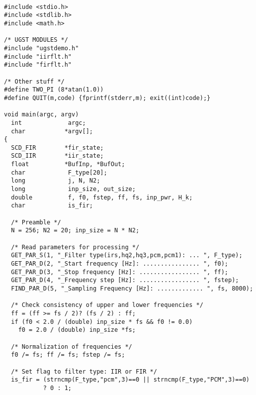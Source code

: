 {\tt\small
\begin{verbatim}
#include <stdio.h>
#include <stdlib.h>
#include <math.h>

/* UGST MODULES */
#include "ugstdemo.h"
#include "iirflt.h"
#include "firflt.h"

/* Other stuff */
#define TWO_PI (8*atan(1.0))
#define QUIT(m,code) {fprintf(stderr,m); exit((int)code);}

void main(argc, argv)
  int             argc;
  char           *argv[];
{
  SCD_FIR        *fir_state;
  SCD_IIR        *iir_state;
  float          *BufInp, *BufOut;
  char            F_type[20];
  long            j, N, N2;
  long            inp_size, out_size;
  double          f, f0, fstep, ff, fs, inp_pwr, H_k;
  char            is_fir;

  /* Preamble */
  N = 256; N2 = 20; inp_size = N * N2;

  /* Read parameters for processing */
  GET_PAR_S(1, "_Filter type(irs,hq2,hq3,pcm,pcm1): ... ", F_type);
  GET_PAR_D(2, "_Start frequency [Hz]: ................ ", f0);
  GET_PAR_D(3, "_Stop frequency [Hz]: ................. ", ff);
  GET_PAR_D(4, "_Frequency step [Hz]: ................. ", fstep);
  FIND_PAR_D(5, "_Sampling Frequency [Hz]: ............. ", fs, 8000);

  /* Check consistency of upper and lower frequencies */
  ff = (ff >= fs / 2)? (fs / 2) : ff;
  if (f0 < 2.0 / (double) inp_size * fs && f0 != 0.0)
    f0 = 2.0 / (double) inp_size *fs;

  /* Normalization of frequencies */
  f0 /= fs; ff /= fs; fstep /= fs;

  /* Set flag to filter type: IIR or FIR */
  is_fir = (strncmp(F_type,"pcm",3)==0 || strncmp(F_type,"PCM",3)==0)
           ? 0 : 1;


\end{verbatim}}
